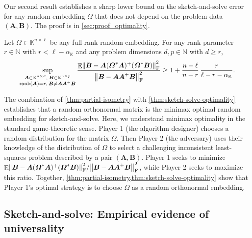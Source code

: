 \documentclass[11pt]{article}
\newcommand{\field}{\mathbb{K}}
\DeclareMathOperator{\rank}{rank}
\newcommand{\mat}[1]{\boldsymbol{#1}}
\newcommand{\norm}[1]{\mleft\| #1 \mright\|}
\DeclareMathOperator{\expect}{\mathbb{E}}
\theoremstyle{definition}
\numberwithin{equation}{section}
\begin{document}
Our second result establishes a sharp lower bound on the sketch-and-solve error for any random embedding $\mat{\varOmega}$ that does not depend on the problem data $(\mat{A},\mat{B})$.
The proof is in \cref{sec:proof_optimality}.
%
\begin{theorem} \label{thm:sketch-solve-optimality}
    Let $\mat{\varOmega} \in \field^{n \times \ell}$ be any full-rank random embedding.
    For any rank parameter $r \in \mathbb{N}$ with $r < \ell - \alpha_\field$ and any problem dimensions $d, p \in \mathbb{N}$ with $d \geq r$,
    \begin{equation*}
        \sup_{\substack{\mat{A}\in \field^{n\times d},\: \mat{B} \in \field^{n\times p} \\
        \rank(\mat{A}) = r,\: \mat{B} \neq \mat{A} \mat{A}^+ \mat{B}}} \frac{\expect \norm{\mat{B} - \mat{A}(\mat{\varOmega}^*\mat{A})^+ (\mat{\varOmega}^*\mat{B})}_{\rm F}^2}{\norm{\mat{B} - \mat{A} \mat{A}^+ \mat{B}}_{\rm F}^2} 
        \ge 1 + \frac{n-\ell}{n-r}\, \frac{r}{\ell - r - \alpha_\field}.
    \end{equation*}
\end{theorem}

\noindent The combination of \cref{thm:partial-isometry} with \cref{thm:sketch-solve-optimality} establishes that a random orthonormal matrix is the minimax optimal random embedding for sketch-and-solve.
Here, we understand minimax optimality in the standard game-theoretic sense.
Player 1 (the algorithm designer) chooses a random distribution for the matrix $\mat{\varOmega}$.
Then Player 2 (the adversary) uses their knowledge of the distribution of $\mat{\varOmega}$ to select a challenging inconsistent least-squares problem described by a pair $(\mat{A},\mat{B})$.
Player 1 seeks to minimize $\expect \norm{\smash{\mat{B} - \mat{A}(\mat{\varOmega}^*\mat{A})^+ (\mat{\varOmega}^*\mat{B})}}_{\rm F}^2 / \norm{\mat{B} - \mat{A} \mat{A}^+ \mat{B}}_{\rm F}^2$, while Player 2 seeks to maximize this ratio.
Together, \cref{thm:partial-isometry,thm:sketch-solve-optimality} show that Player 1's optimal strategy is to choose $\mat{\varOmega}$ as a random orthonormal embedding.

\subsection{Sketch-and-solve: Empirical evidence of universality} \label{sec:sketch-solve-discussion}
\end{document}
